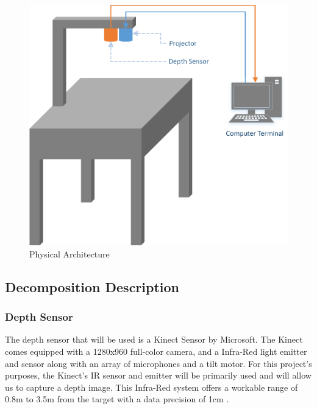 \documentclass[onecolumn, draftclsnofoot,10pt, compsoc]{IEEEtran}
\begin{document}
\begin{figure}[H]
	\centering
	\includegraphics[width=6in]{PhysicalDiagram}
    \caption{Physical Architecture}
    \label{fig:physicalarchitecture}
\end{figure}

\subsection{Decomposition Description}

\subsubsection{Depth Sensor}

The depth sensor that will be used is a Kinect Sensor by Microsoft.  
The Kinect comes equipped with a 1280x960 full-color camera, and a Infra-Red light emitter and sensor along with an array of microphones and a tilt motor.
For this project's purposes, the Kinect's IR sensor and emitter will be primarily used and will allow us to capture a depth image.
This Infra-Red system offers a workable range of 0.8m to 3.5m from the target with a data precision of 1cm \cite{andersen_jensen_lisouski_2012}.
\end{document}
